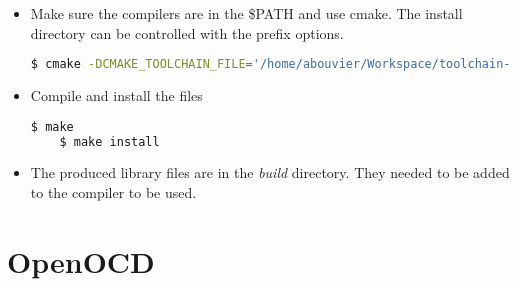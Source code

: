 \documentclass{article}
\begin{document}
\begin{itemize}
    \item Make sure the compilers are in the \$PATH and use cmake. The install directory can be controlled with the prefix options.
    
    \begin{lstlisting}[language=bash]
    $ cmake -DCMAKE_TOOLCHAIN_FILE='/home/abouvier/Workspace/toolchain-arm-linux-gnueabihf.cmake' -DCMAKE_INSTALL_PREFIX=$(pwd) -DLIBFTDI_LIBRARY_DIRS=$(pwd) ..
    \end{lstlisting}
    
    \item Compile and install the files
    
    \begin{lstlisting}[language=bash]
    $ make
    $ make install
    \end{lstlisting}
    
    \item The produced library files are in the \textit{build} directory. They needed to be added to the compiler to be used. 
    
    \end{itemize}
    
    \section{OpenOCD}
    
\end{document}
